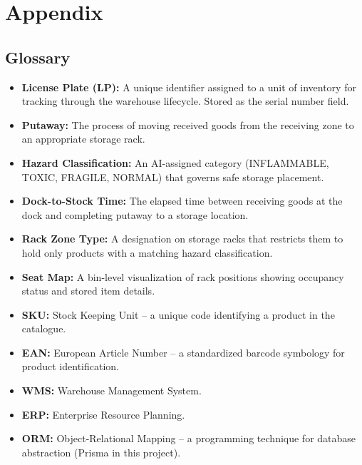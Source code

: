 \documentclass[12pt,a4paper]{report}
\begin{document}
\chapter{Appendix}

\section{Glossary}
\begin{itemize}
    \item \textbf{License Plate (LP):} A unique identifier assigned to a unit of inventory for tracking through the warehouse lifecycle. Stored as the serial number field.
    \item \textbf{Putaway:} The process of moving received goods from the receiving zone to an appropriate storage rack.
    \item \textbf{Hazard Classification:} An AI-assigned category (INFLAMMABLE, TOXIC, FRAGILE, NORMAL) that governs safe storage placement.
    \item \textbf{Dock-to-Stock Time:} The elapsed time between receiving goods at the dock and completing putaway to a storage location.
    \item \textbf{Rack Zone Type:} A designation on storage racks that restricts them to hold only products with a matching hazard classification.
    \item \textbf{Seat Map:} A bin-level visualization of rack positions showing occupancy status and stored item details.
    \item \textbf{SKU:} Stock Keeping Unit -- a unique code identifying a product in the catalogue.
    \item \textbf{EAN:} European Article Number -- a standardized barcode symbology for product identification.
    \item \textbf{WMS:} Warehouse Management System.
    \item \textbf{ERP:} Enterprise Resource Planning.
    \item \textbf{ORM:} Object-Relational Mapping -- a programming technique for database abstraction (Prisma in this project).
\end{itemize}
\end{document}
